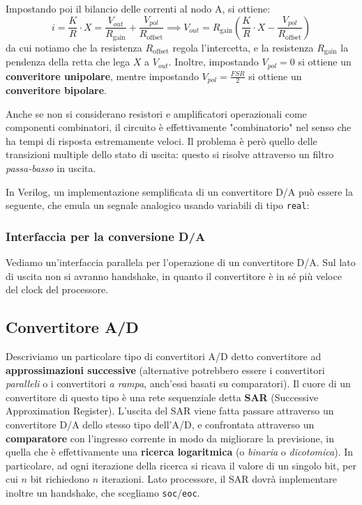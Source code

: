 \documentclass[a4paper,11pt]{article}
\begin{document}
Impostando poi il bilancio delle correnti al nodo A, si ottiene:
$$
i = \frac{K}{R} \cdot X = \frac{V_{out}}{R_\text{gain}} + \frac{V_{pol}}{R_\text{offset}} \implies V_{out} = R_\text{gain} \left( \frac{K}{R} \cdot X - \frac{V_{pol}}{R_\text{offset}} \right)
$$
da cui notiamo che la resistenza $R_\text{offset}$ regola l'intercetta, e la resistenza $R_\text{gain}$ la pendenza della retta che lega $X$ a $V_{out}$.
Inoltre, impostando $V_{pol} = 0$ si ottiene un \textbf{converitore unipolare}, mentre impostando $V_{pol} = \frac{FSR}{2}$ si ottiene un \textbf{converitore bipolare}.

\par\smallskip

Anche se non si considerano resistori e amplificatori operazionali come componenti combinatori, il circuito è effettivamente "combinatorio" nel senso che ha tempi di risposta estremamente veloci.
Il problema è però quello delle transizioni multiple dello stato di uscita: questo si risolve attraverso un filtro \textit{passa-basso} in uscita.

\lstset{language=verilog}

In Verilog, un implementazione semplificata di un convertitore D/A può essere la seguente, che emula un segnale analogico usando variabili di tipo \lstinline|real|:



\subsubsection{Interfaccia per la conversione D/A}
Vediamo un'interfaccia parallela per l'operazione di un convertitore D/A.
Sul lato di uscita non si avranno handshake, in quanto il convertitore è in sé più veloce del clock del processore.



\subsection{Convertitore A/D}
Descriviamo un particolare tipo di convertitori A/D detto convertitore ad \textbf{approssimazioni successive} (alternative potrebbero essere i convertitori \textit{paralleli} o i convertitori \textit{a rampa}, anch'essi basati su comparatori).
Il cuore di un convertitore di questo tipo è una rete sequenziale detta \textbf{SAR} (Successive Approximation Register).
L'uscita del SAR viene fatta passare attraverso un convertitore D/A dello stesso tipo dell'A/D, e confrontata attraverso un \textbf{comparatore} con l'ingresso corrente in modo da migliorare la previsione, in quella che è effettivamente una \textbf{ricerca logaritmica} (o \textit{binaria} o \textit{dicotomica}).
In particolare, ad ogni iterazione della ricerca si ricava il valore di un singolo bit, per cui $n$ bit richiedono $n$ iterazioni.
Lato processore, il SAR dovrà implementare inoltre un handshake, che scegliamo \lstinline|soc|/\lstinline|eoc|.
\end{document}
